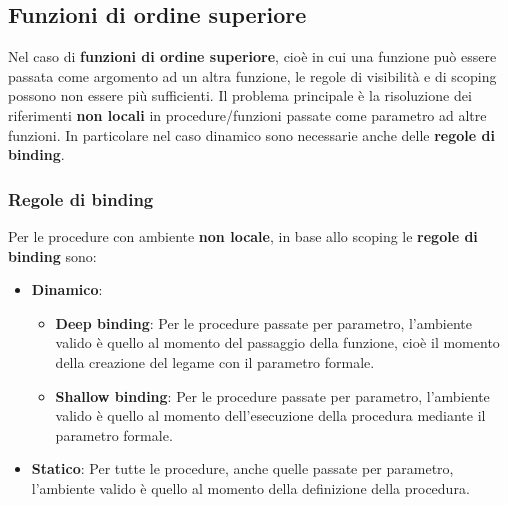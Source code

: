\documentclass[a4paper]{article}
\begin{document}
\subsection{Funzioni di ordine superiore}
Nel caso di \textbf{funzioni di ordine superiore}, cioè in cui una funzione può
essere passata come argomento ad un altra funzione, le regole di visibilità e di
scoping possono non essere più sufficienti.
Il problema principale è la risoluzione
dei riferimenti \textbf{non locali} in procedure/funzioni passate come parametro ad
altre funzioni.
In particolare nel caso dinamico sono necessarie anche delle \textbf{regole di
binding}.

\subsubsection{Regole di binding}
Per le procedure con ambiente \textbf{non locale}, in base allo scoping le \textbf{regole
di binding} sono:
\begin{itemize}
  \item \textbf{Dinamico}:
    \begin{itemize}
      \item \textbf{Deep binding}: Per le procedure passate per parametro, l'ambiente valido è quello al
        momento del passaggio della funzione, cioè il momento della creazione
        del legame con il parametro formale.

      \item \textbf{Shallow binding}: Per le procedure passate per parametro, l'ambiente valido
        è quello al momento
        dell'esecuzione della procedura mediante il parametro formale.
    \end{itemize}

  \item \textbf{Statico}:
    Per tutte le procedure, anche quelle passate per parametro,
    l'ambiente valido è quello al momento della definizione della
    procedura.
\end{itemize}
\end{document}

